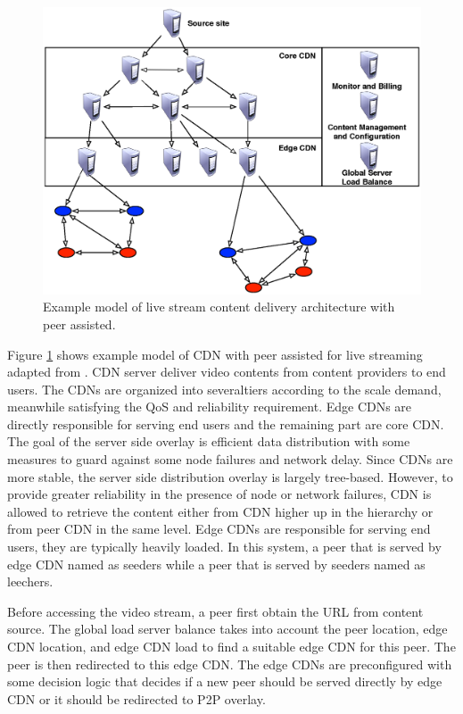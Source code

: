 \documentclass[conference]{IEEEtran}
\begin{document}
\begin{figure}[thb]
\begin{center}
\includegraphics[scale=0.4]{graphs/livesky.eps}
\end{center}
\caption{Example model of live stream content delivery architecture with peer assisted.}
\label{fig:iptv}
\end{figure} 

Figure \ref{fig:iptv} shows example model of CDN with peer assisted for live streaming adapted from \cite{Yin:2010:LEC:1823746.1823750}.
CDN server deliver video contents from content providers to end users. 
The CDNs are organized into severaltiers according to the scale demand, meanwhile satisfying the QoS and reliability requirement. 
Edge CDNs are directly responsible for serving end users and the remaining part are core CDN.
The goal of the server side overlay is efficient data distribution with some measures to guard against some node failures and network delay.
Since CDNs are more stable, the server side distribution overlay is largely tree-based. 
However, to provide greater reliability in the presence of node or network failures, CDN is allowed to retrieve the content either from CDN higher up in the hierarchy or from peer CDN in the same level.
Edge CDNs are responsible for serving end users, they are typically heavily loaded. 
In this system, a peer that is served by edge CDN named as seeders while a peer that is served by seeders named as leechers. 

Before accessing the video stream, a peer first obtain the URL from content source.  
The global load server balance takes into account the peer location, edge CDN location, and edge CDN load to find a suitable edge CDN for this peer.
The peer is then redirected to this edge CDN.
The edge CDNs are preconfigured with some decision logic that decides if a new peer should be served directly by edge CDN or it should be redirected to P2P overlay.
\end{document}

